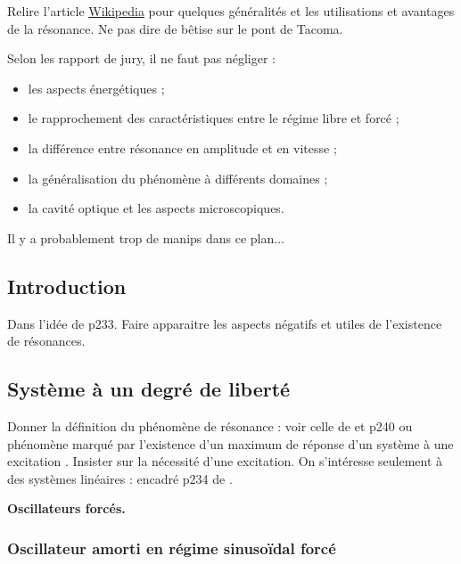 \begin{remarque}
Relire l'article \href{https://fr.wikipedia.org/wiki/R\%C3\%A9sonance}{Wikipedia} pour quelques généralités et les utilisations et avantages de la résonance.
Ne pas dire de bêtise sur le pont de Tacoma.

\noindent
Selon les rapport de jury, il ne faut pas négliger :
\begin{itemize}
\item les aspects énergétiques ;
\item le rapprochement des caractéristiques entre le régime libre et forcé ;
\item la différence entre résonance en amplitude et en vitesse ;
\item la généralisation du phénomène à différents domaines ;
\item la cavité optique et les aspects microscopiques.
\end{itemize}

\noindent
Il y a probablement trop de manips dans ce plan...
\end{remarque}

\subsection*{Introduction}

Dans l'idée de \cite{Michel2017} p233.
Faire apparaitre les aspects négatifs et utiles de l'existence de résonances.

\subsection{Système à un degré de liberté}

Donner la définition du phénomène de résonance : voir celle de \cite{Taillet2018} et \cite{Michel2017} p240 ou \og phénomène marqué par l'existence d'un maximum de réponse d'un système à une excitation \fg{}.
Insister sur la nécessité d'une excitation.
On s'intéresse seulement à des systèmes linéaires : encadré p234 de \cite{Michel2017}.

\begin{slide}
\textbf{Oscillateurs forcés.}
\end{slide}

\subsubsection{Oscillateur amorti en régime sinusoïdal forcé}

